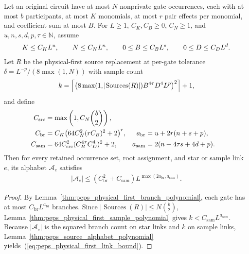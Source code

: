 \begin{lemma}
    \label{thm:peps_physical_first_link_polynomial}
    \leanok
    Let an original circuit have at most $N$ nonprivate gate occurrences, each
    with at most $b$ participants, at most $K$ monomials, at most $r$ pair
    effects per monomial, and coefficient sum at most $B$. For $L\geq1$,
    $C_K,C_B\geq0$, $C_N\geq1$, and $u,n,s,d,p,\tau\in\mathbb N$, assume
    \begin{align}
        K\leq C_KL^u,\qquad N\leq C_NL^n,\qquad
        0\leq B\leq C_BL^s,\qquad 0\leq D\leq C_DL^d.\notag
    \end{align}
    Let $R$ be the physical-first source replacement at per-gate tolerance
    $\delta=L^{-p}/(8\max(1,N))$ with sample count
    \begin{align}
        k=\left\lceil
        \bigl(8\max(1,\lvert\operatorname{Sources}(R)\rvert)
        B^{4\tau}D^4L^p\bigr)^2
        \right\rceil+1,\notag
    \end{align}
    and define
    \begin{align}
        C_{\mathrm{src}} & =\max\left(1,C_N\binom b2\right),                          \notag                              \\
        C_{\mathrm{br}}  & =C_K\bigl(64C_N^2(rC_B)^2+2\bigr)^r,
                         & a_{\mathrm{br}}                                                   & =u+2r(n+s+p),       \notag \\
        C_{\mathrm{sam}} & =64C_{\mathrm{src}}^2
        (C_B^{4\tau}C_D^4)^2+2,
                         & a_{\mathrm{sam}}                                                  & =2(n+4\tau s+4d+p).
        \label{eq:peps_physical_first_link_constants}
    \end{align}
    Then for every retained occurrence set, root assignment, and star or sample
    link $e$, its alphabet $\mathcal A_e$ satisfies
    \begin{align}
        \lvert\mathcal A_e\rvert
        \leq (C_{\mathrm{br}}^2+C_{\mathrm{sam}})
        L^{\max(2a_{\mathrm{br}},a_{\mathrm{sam}})}.
        \label{eq:peps_physical_first_link_bound}
    \end{align}
\end{lemma}
\begin{proof}
    \leanok
    By Lemma~\ref{thm:peps_physical_first_branch_polynomial}, each gate has at
    most $C_{\mathrm{br}}L^{a_{\mathrm{br}}}$ branches. Since
    $|\operatorname{Sources}(R)|\le N\binom{b}{2}$,
    Lemma~\ref{thm:peps_physical_first_sample_polynomial} gives
    $k<C_{\mathrm{sam}}L^{a_{\mathrm{sam}}}$. Because $|\mathcal A_e|$ is the
    squared branch count on star links and $k$ on sample links,
    Lemma~\ref{thm:peps_source_alphabet_polynomial} yields~(\ref{eq:peps_physical_first_link_bound}).
\end{proof}

